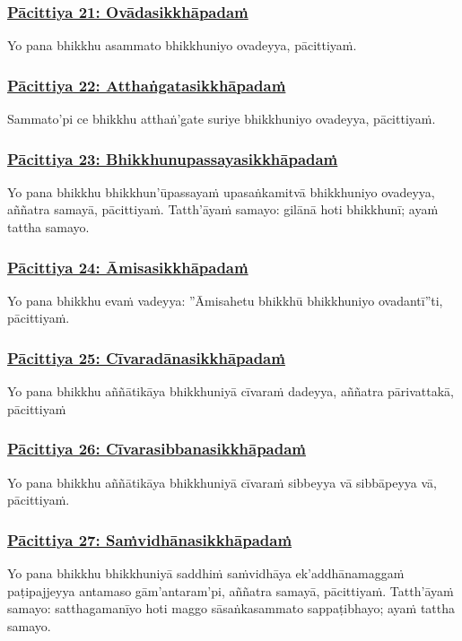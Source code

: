 \subsubsection*{\hyperref[exp]{Pācittiya 21: Ovādasikkhāpadaṁ}}
\label{pac21}

Yo pana bhikkhu asammato bhikkhuniyo ovadeyya, pācittiyaṁ.

\subsubsection*{\hyperref[exp22]{Pācittiya 22: Atthaṅgatasikkhāpadaṁ}}
\label{pac22}
Sammato'pi ce bhikkhu atthaṅ'gate suriye bhikkhuniyo ovadeyya, pācittiyaṁ.

\subsubsection*{\hyperref[exp23]{Pācittiya 23: Bhikkhunupassayasikkhāpadaṁ}}
\label{pac23}
Yo pana bhikkhu bhikkhun'ūpassayaṁ upasaṅkamitvā bhikkhuniyo ovadeyya, aññatra samayā, pācittiyaṁ. Tatth'āyaṁ samayo: gilānā hoti bhikkhunī; ayaṁ tattha samayo.

\subsubsection*{\hyperref[exp24]{Pācittiya 24: Āmisasikkhāpadaṁ}}
\label{pac24}
Yo pana bhikkhu evaṁ vadeyya: ''Āmisahetu bhikkhū bhikkhuniyo ovadantī''ti, pācittiyaṁ.

\subsubsection*{\hyperref[exp25]{Pācittiya 25: Cīvaradānasikkhāpadaṁ}}
\label{pac25}
Yo pana bhikkhu aññātikāya bhikkhuniyā cīvaraṁ dadeyya, aññatra pārivattakā, pācittiyaṁ

\subsubsection*{\hyperref[exp26]{Pācittiya 26: Cīvarasibbanasikkhāpadaṁ}}
\label{pac26}
Yo pana bhikkhu aññātikāya bhikkhuniyā cīvaraṁ sibbeyya vā sibbāpeyya vā, pācittiyaṁ.

\subsubsection*{\hyperref[exp27]{Pācittiya 27: Saṁvidhānasikkhāpadaṁ}}
\label{pac27}
Yo pana bhikkhu bhikkhuniyā saddhiṁ saṁvidhāya ek'addhānamaggaṁ paṭipajjeyya antamaso gām'antaram'pi, aññatra samayā, pācittiyaṁ. Tatth'āyaṁ samayo: satthagamanīyo hoti maggo sāsaṅkasammato sappaṭibhayo; ayaṁ tattha samayo.

